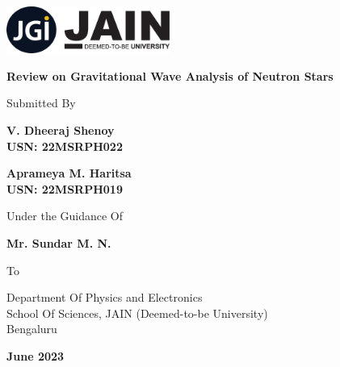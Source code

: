 \documentclass[12pt]{article}
\def \projectname {Review on Gravitational Wave Analysis of Neutron Stars}
\def \authone {V. Dheeraj Shenoy}
\def \authtwo {Aprameya M. Haritsa}
\def \guidename {Mr. Sundar M. N.}
\begin{document}
\begin{center}

\thispagestyle{empty}

\includegraphics[width=0.4\textwidth, height=0.12\textwidth, ]{images/jain logo.png}

\vspace{1cm}

\textbf{\huge{{\projectname}}}

\vspace{0.7cm}

\Large{Submitted By}

\vspace{0.3cm}

\textbf{\large{\authone}}\\
\textbf{\normalsize{USN: 22MSRPH022}}

\vspace{0.5cm}

\textbf{\large{\authtwo}}\\
\textbf{\normalsize{USN: 22MSRPH019}}

\vspace{0.75cm}

\Large{Under the Guidance Of}

\textbf{\large{\guidename}}

\vspace{0.75cm}

To

\vspace{0.4cm}

\large

Department Of Physics and Electronics \\
School Of Sciences, JAIN (Deemed-to-be University)\\
Bengaluru\\

\vspace{1cm}

\textbf{\large{June 2023}}

\end{center}

\newpage






\thispagestyle{empty}
\tableofcontents
\end{document}
